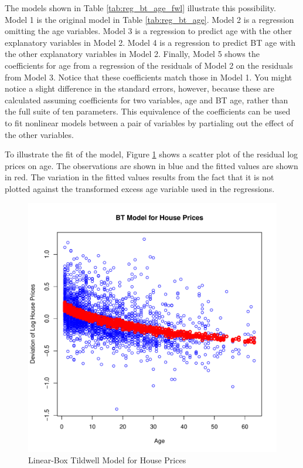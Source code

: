 The models shown in
Table \ref{tab:reg_bt_age_fwl}
illustrate this possibility. 
Model 1 is the original model in 
Table \ref{tab:reg_bt_age}. 
Model 2 is a regression omitting the age variables. 
Model 3 is a regression to predict age with the other explanatory variables in Model 2.
Model 4 is a regression to predict BT age with the other explanatory variables in Model 2.
Finally, Model 5 shows the coefficients for age
from a regression of the residuals of Model 2
on the residuals from Model 3. 
Notice that these coefficients match those in Model 1. 
You might notice a slight difference in the standard errors, however, 
because these are calculated assuming coefficients 
for two variables, age and BT age,
rather than the full suite of ten parameters.
This equivalence of the coefficients can be used to fit
nonlinear models between a pair of variables by 
partialing out the effect of the other variables.



\pagebreak 
To illustrate the fit of the model, 
Figure \ref{fig:dev_vs_age} shows a scatter plot 
of the residual log prices on age. 
The observations are shown in blue
and the fitted values are shown in red.
The variation in the fitted values results from the 
fact that it is not plotted against the transformed excess age variable used in the regressions.


\begin{figure}[h!]
  \centering
  \includegraphics[scale = 0.5, keepaspectratio=true]{../Figures/dev_vs_age}
  \caption{Linear-Box Tildwell Model for House Prices} \label{fig:dev_vs_age}
\end{figure}



